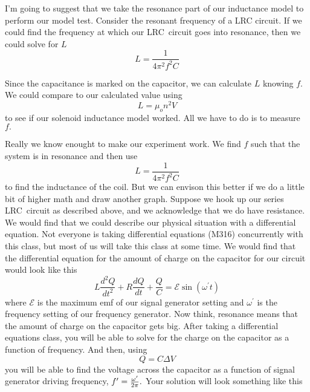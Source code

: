 I'm going to suggest that we take the resonance part of our inductance model
to perform our model test. Consider the resonant frequency of a LRC circuit.
If we could find the frequency at which our LRC\ circuit goes into
resonance, then we could solve for $L$%
\begin{equation*}
L=\frac{1}{4\pi ^{2}f^{2}C}
\end{equation*}

Since the capacitance is marked on the capacitor, we can calculate $L$
knowing $f.$ We could compare to our calculated value using 
\begin{equation*}
L=\mu _{o}n^{2}V
\end{equation*}%
to see if our solenoid inductance model worked. All we have to do is to
measure $f.$

Really we know enought to make our experiment work. We find $f$ such that
the system is in resonance and then use 
\begin{equation*}
L=\frac{1}{4\pi ^{2}f^{2}C}
\end{equation*}%
to find the inductance of the coil. But we can envison this better if we do
a little bit of higher math and draw another graph. Suppose we hook up our
series LRC\ circuit as described above, and we acknowledge that we do have
resistance. We would find that we could describe our physical situation with
a differential equation. Not everyone is taking differential equations
(M316) concurrently with this class, but most of us will take this class at
some time. We would find that the differential equation for the amount of
charge on the capacitor for our circuit would look like this%
\begin{equation*}
L\frac{d^{2}Q}{dt^{2}}+R\frac{dQ}{dt}+\frac{Q}{C}=\mathcal{E}\sin \left(
\omega ^{\prime }t\right)
\end{equation*}%
where $\mathcal{E}$ is the maximum emf of our signal generator setting and $%
\omega ^{\prime }$ is the frequency setting of our frequency generator. Now
think, resonance means that the amount of charge on the capacitor gets big.
After taking a differential equations class, you will be able to solve for
the charge on the capacitor as a function of frequency. And then, using 
\begin{equation*}
Q=C\Delta V
\end{equation*}%
you will be able to find the voltage across the capacitor as a function of
signal generator driving frequency, $f^{\prime }=\frac{\omega ^{\prime }}{%
2\pi }.$ Your solution will look something like this 
